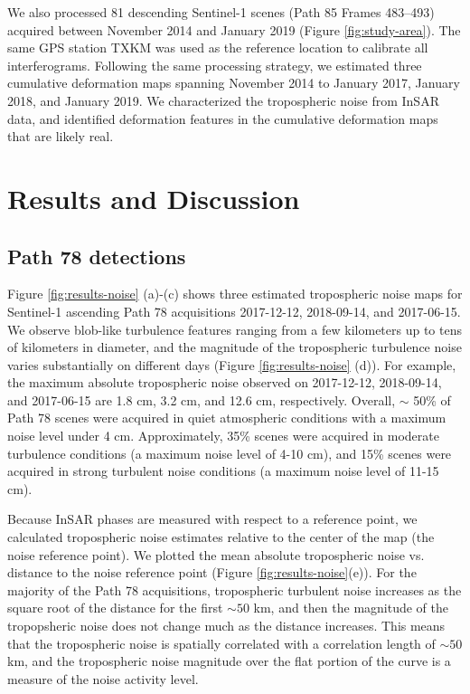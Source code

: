 We also processed 81 descending Sentinel-1 scenes (Path 85 Frames 483–493) acquired between November 2014 and January 2019 (Figure \ref{fig:study-area}). The same GPS station TXKM was used as the reference location to calibrate all interferograms. Following the same processing strategy, we estimated three cumulative deformation maps spanning November 2014 to January 2017, January 2018, and January 2019. We characterized the tropospheric noise from InSAR data, and identified deformation features in the cumulative deformation maps that are likely real.



\section{Results and Discussion}
\subsection{Path 78 detections}
\label{sec:results:path78}
Figure \ref{fig:results-noise} (a)-(c) shows three estimated tropospheric noise maps for Sentinel-1 ascending Path 78 acquisitions 2017-12-12, 2018-09-14, and 2017-06-15. We observe blob-like turbulence features ranging from a few kilometers up to tens of kilometers in diameter, and the magnitude of the tropospheric turbulence noise varies substantially on different days (Figure \ref{fig:results-noise} (d)). For example, the maximum absolute tropospheric noise observed on 2017-12-12, 2018-09-14, and 2017-06-15 are 1.8 cm, 3.2 cm, and 12.6 cm, respectively. Overall, $\sim$ 50\% of Path 78 scenes were acquired in quiet atmospheric conditions with a maximum noise level under 4 cm. Approximately, 35\% scenes were acquired in moderate turbulence conditions (a maximum noise level of 4-10 cm), and 15\% scenes were acquired in strong turbulent noise conditions (a maximum noise level of 11-15 cm). 

Because InSAR phases are measured with respect to a reference point, we calculated tropospheric noise estimates relative to the center of the map (the noise reference point). We plotted the mean absolute tropospheric noise vs. distance to the noise reference point (Figure \ref{fig:results-noise}(e)). For the majority of the Path 78 acquisitions, tropospheric turbulent noise increases as the square root of the distance for the first $\sim 50$ km, and then the magnitude of the tropopsheric noise does not change much as the distance increases. This means that the tropospheric noise is spatially correlated with a correlation length of $\sim 50$ km, and the tropospheric noise magnitude over the flat portion of the curve is a measure of the noise activity level. 



